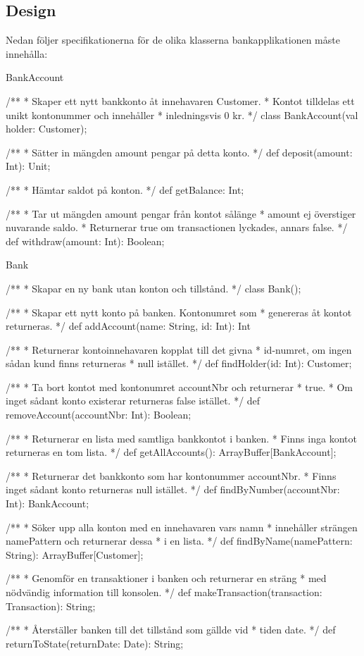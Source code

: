 \subsection{Design}
Nedan följer specifikationerna för de olika klasserna bankapplikationen måste innehålla:

BankAccount

\begin{Code}
/**
 * Skaper ett nytt bankkonto åt innehavaren Customer.
 * Kontot tilldelas ett unikt kontonummer och innehåller 
 * inledningsvis 0 kr.
 */
class BankAccount(val holder: Customer);

  /**
   * Sätter in mängden amount pengar på detta konto.
   */
  def deposit(amount: Int): Unit;

  /**
   * Hämtar saldot på konton.
   */
  def getBalance: Int;

/**
   * Tar ut mängden amount pengar från kontot sålänge
   * amount ej överstiger nuvarande saldo.
   * Returnerar true om transactionen lyckades, annars false. 
   */
  def withdraw(amount: Int): Boolean;

\end{Code}

Bank

\begin{Code}
/**
 * Skapar en ny bank utan konton och tillstånd. 
 */
class Bank();

/**
   * Skapar ett nytt konto på banken. Kontonumret som 
   * genereras åt kontot returneras.
   */
  def addAccount(name: String, id: Int): Int

/**
   * Returnerar kontoinnehavaren kopplat till det givna 
   * id-numret, om ingen sådan kund finns returneras 
   * null istället.
   */
  def findHolder(id: Int): Customer;

/**
   * Ta bort kontot med kontonumret accountNbr och returnerar
   * true. 
   * Om inget sådant konto existerar returneras false istället. 
   */
  def removeAccount(accountNbr: Int): Boolean;

/**
   * Returnerar en lista med samtliga bankkontot i banken.
   * Finns inga kontot returneras en tom lista.
   */
  def getAllAccounts(): ArrayBuffer[BankAccount];

/**
   * Returnerar det bankkonto som har kontonummer accountNbr.
   * Finns inget sådant konto returneras null istället.
   */
  def findByNumber(accountNbr: Int): BankAccount;

/**
   * Söker upp alla konton med en innehavaren vars namn 
   * innehåller strängen namePattern och returnerar dessa
   *  i en lista.
   */
  def findByName(namePattern: String): ArrayBuffer[Customer];

/**
   * Genomför en transaktioner i banken och returnerar en sträng 
   * med nödvändig information till konsolen.
   */
  def makeTransaction(transaction: Transaction): String;

/**
   * Återställer banken till det tillstånd som gällde vid
   * tiden date.
   */
  def returnToState(returnDate: Date): String;


\end{Code}

